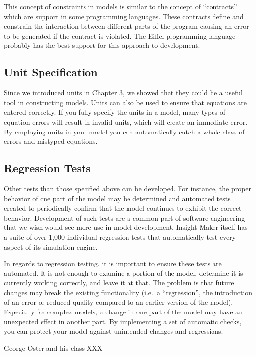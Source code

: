 \documentclass[]{memoir}
\begin{document}
This concept of constraints in models is similar to the concept of
``contracts'' which are support in some programming languages. These
contracts define and constrain the interaction between different parts
of the program causing an error to be generated if the contract is
violated. The Eiffel programming language probably has the best support
for this approach to development.

\subsection{Unit Specification}

Since we introduced units in Chapter 3, we showed that they could be a
useful tool in constructing models. Units can also be used to ensure
that equations are entered correctly. If you fully specify the units in
a model, many types of equation errors will result in invalid units,
which will create an immediate error. By employing units in your model
you can automatically catch a whole class of errors and mistyped
equations.

\subsection{Regression Tests}

Other tests than those specified above can be developed. For instance,
the proper behavior of one part of the model may be determined and
automated tests created to periodically confirm that the model continues
to exhibit the correct behavior. Development of such tests are a common
part of software engineering that we wish would see more use in model
development. Insight Maker itself has a suite of over 1,000 individual
regression tests that automatically test every aspect of its simulation
engine.

In regards to regression testing, it is important to ensure these tests
are automated. It is not enough to examine a portion of the model,
determine it is currently working correctly, and leave it at that. The
problem is that future changes may break the existing functionality
(i.e.~a ``regression'', the introduction of an error or reduced quality
compared to an earlier version of the model). Especially for complex
models, a change in one part of the model may have an unexpected effect
in another part. By implementing a set of automatic checks, you can
protect your model against unintended changes and regressions.

George Oster and his class XXX
\end{document}
